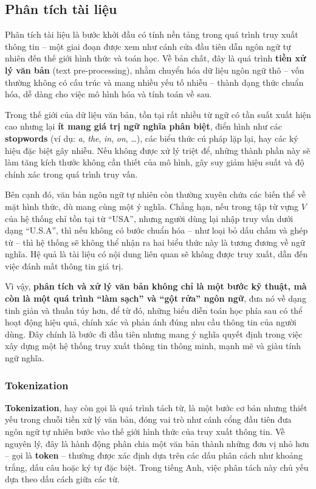 \subsection{Phân tích tài liệu}
Phân tích tài liệu là bước khởi đầu có tính nền tảng trong quá trình truy xuất thông tin -- một giai đoạn được xem như cánh cửa đầu tiên dẫn ngôn ngữ tự nhiên đến thế giới hình thức và toán học. Về bản chất, đây là quá trình \textbf{tiền xử lý văn bản} (text pre-processing), nhằm chuyển hóa dữ liệu ngôn ngữ thô -- vốn thường không có cấu trúc và mang nhiều yếu tố nhiễu -- thành dạng thức chuẩn hóa, dễ dàng cho việc mô hình hóa và tính toán về sau.

Trong thế giới của dữ liệu văn bản, tồn tại rất nhiều từ ngữ có tần suất xuất hiện cao nhưng lại \textbf{ít mang giá trị ngữ nghĩa phân biệt}, điển hình như các \textbf{stopwords} (ví dụ: \textit{a}, \textit{the}, \textit{in}, \textit{on}, \dots), các biểu thức cú pháp lặp lại, hay các ký hiệu đặc biệt gây nhiễu. Nếu không được xử lý triệt để, những thành phần này sẽ làm tăng kích thước không cần thiết của mô hình, gây suy giảm hiệu suất và độ chính xác trong quá trình truy vấn.

Bên cạnh đó, văn bản ngôn ngữ tự nhiên còn thường xuyên chứa các biến thể về mặt hình thức, dù mang cùng một ý nghĩa. Chẳng hạn, nếu trong tập từ vựng \(V\) của hệ thống chỉ tồn tại từ ``USA'', nhưng người dùng lại nhập truy vấn dưới dạng ``U.S.A'', thì nếu không có bước chuẩn hóa -- như loại bỏ dấu chấm và ghép từ -- thì hệ thống sẽ không thể nhận ra hai biểu thức này là tương đương về ngữ nghĩa. Hệ quả là tài liệu có nội dung liên quan sẽ không được truy xuất, dẫn đến việc đánh mất thông tin giá trị.

Vì vậy, \textbf{phân tích và xử lý văn bản không chỉ là một bước kỹ thuật, mà còn là một quá trình ``làm sạch'' và ``gột rửa'' ngôn ngữ}, đưa nó về dạng tinh giản và thuần túy hơn, để từ đó, những biểu diễn toán học phía sau có thể hoạt động hiệu quả, chính xác và phản ánh đúng nhu cầu thông tin của người dùng. Đây chính là bước đi đầu tiên nhưng mang ý nghĩa quyết định trong việc xây dựng một hệ thống truy xuất thông tin thông minh, mạnh mẽ và giàu tính ngữ nghĩa.

\subsubsection{Tokenization}
\textbf{Tokenization}, hay còn gọi là quá trình tách từ, là một bước cơ bản nhưng thiết yếu trong chuỗi tiền xử lý văn bản, đóng vai trò như cánh cổng đầu tiên đưa ngôn ngữ tự nhiên bước vào thế giới hình thức của truy xuất thông tin. Về nguyên lý, đây là hành động phân chia một văn bản thành những đơn vị nhỏ hơn -- gọi là \textbf{token} -- thường được xác định dựa trên các dấu phân cách như khoảng trắng, dấu câu hoặc ký tự đặc biệt. Trong tiếng Anh, việc phân tách này chủ yếu dựa theo dấu cách giữa các từ.

